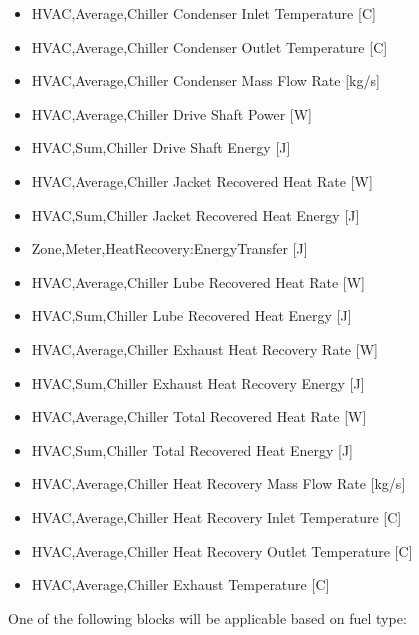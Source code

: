 \begin{itemize}
\item
  HVAC,Average,Chiller Condenser Inlet Temperature {[}C{]}
\item
  HVAC,Average,Chiller Condenser Outlet Temperature {[}C{]}
\item
  HVAC,Average,Chiller Condenser Mass Flow Rate {[}kg/s{]}
\item
  HVAC,Average,Chiller Drive Shaft Power {[}W{]}
\item
  HVAC,Sum,Chiller Drive Shaft Energy {[}J{]}
\item
  HVAC,Average,Chiller Jacket Recovered Heat Rate {[}W{]}
\item
  HVAC,Sum,Chiller Jacket Recovered Heat Energy {[}J{]}
\item
  Zone,Meter,HeatRecovery:EnergyTransfer {[}J{]}
\item
  HVAC,Average,Chiller Lube Recovered Heat Rate {[}W{]}
\item
  HVAC,Sum,Chiller Lube Recovered Heat Energy {[}J{]}
\item
  HVAC,Average,Chiller Exhaust Heat Recovery Rate {[}W{]}
\item
  HVAC,Sum,Chiller Exhaust Heat Recovery Energy {[}J{]}
\item
  HVAC,Average,Chiller Total Recovered Heat Rate {[}W{]}
\item
  HVAC,Sum,Chiller Total Recovered Heat Energy {[}J{]}
\item
  HVAC,Average,Chiller Heat Recovery Mass Flow Rate {[}kg/s{]}
\item
  HVAC,Average,Chiller Heat Recovery Inlet Temperature {[}C{]}
\item
  HVAC,Average,Chiller Heat Recovery Outlet Temperature {[}C{]}
\item
  HVAC,Average,Chiller Exhaust Temperature {[}C{]}
\end{itemize}

One of the following blocks will be applicable based on fuel type:

